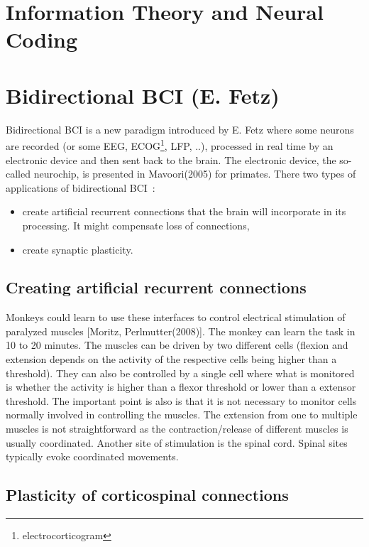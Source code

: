 \documentclass[10pt,a4paper]{article}
\begin{document}
\section{Information Theory and Neural Coding}



\section{Bidirectional BCI (E. Fetz)}

Bidirectional BCI is a new paradigm introduced by E. Fetz where some
neurons are recorded (or some EEG, ECOG\footnote{electrocorticogram}, LFP, ..), processed in real
time by an electronic device and then sent back to the brain. The
electronic device, the so-called neurochip, is presented in
Mavoori(2005) for primates. There two types of applications of
bidirectional BCI~:
\begin{itemize}
\item create artificial recurrent connections that the brain will
  incorporate in its processing. It might compensate loss of
  connections,
\item create synaptic plasticity.
\end{itemize}

\subsection{Creating artificial recurrent connections}

Monkeys could learn to use these interfaces to control electrical
stimulation of paralyzed muscles [Moritz, Perlmutter(2008)]. The
monkey can learn the task in 10 to 20 minutes. The muscles can be
driven by two different cells (flexion and extension depends on the
activity of the respective cells being higher than a threshold). They
can also be controlled by a single cell where what is monitored is
whether the activity is higher than a flexor threshold or lower than a
extensor threshold. The important point is also is that it is not
necessary to monitor cells normally involved in controlling the
muscles. The extension from one to multiple muscles is not
straightforward as the contraction/release of different muscles is
usually coordinated. Another site of stimulation is the spinal
cord. Spinal sites typically evoke coordinated movements. 

\subsection{Plasticity of corticospinal connections}
\end{document}
